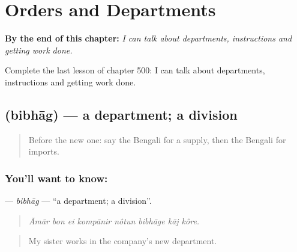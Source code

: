 
\chapter{Orders and Departments}
\label{ch:bn-orders-and-departments}

\begin{chapteropening}
\textbf{By the end of this chapter:} \emph{I can talk about departments, instructions and getting work done.}

Complete the last lesson of chapter 500: I can talk about departments, instructions and getting work done.
\end{chapteropening}

\section[\texorpdfstring{\bn{বিভাগ} (bibhāg)}{বিভাগ (bibhāg)}]{ (bibhāg) — a department; a division}

\label{lesson:BN-C500-bibhag}



\begin{quote}
Before the new one: say the Bengali for a supply, then the Bengali for imports.
\end{quote}

\subsection*{You'll want to know: }
\textbf{} — \emph{bibhāg} — \textquotedblleft{}a department; a division\textquotedblright{}.

\begin{quote}
       
\end{quote}

\begin{quote}
\emph{Āmār bon ei kompānir nôtun bibhāge kāj kôre.}
\end{quote}

\begin{quote}
My sister works in the company's new department.
\end{quote}


